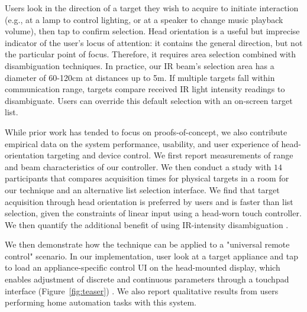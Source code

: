 Users look in the direction of a target they wish to acquire to initiate interaction (e.g., at a lamp to control lighting, or at a speaker to change music playback volume), then tap to confirm selection.  
%
Head orientation is a useful but imprecise indicator of the user's locus of attention: it contains the general direction, but not the particular point of focus. Therefore, it requires area selection  combined with disambiguation techniques.
In practice, our IR beam's selection area has a diameter of 60-120cm at distances up to 5m.
If multiple targets fall within communication range, targets compare received IR light intensity readings to disambiguate. Users can override this default selection with an  on-screen target list.


While prior work has tended to focus on proofs-of-concept, we also contribute empirical data on the system performance, usability, and user experience of head-orientation targeting and device control. We first report measurements of range and beam characteristics of our controller. We then conduct a study with $14$ participants that compares acquisition times for physical targets in a room for our technique and an alternative list selection interface. We find that target acquisition through head orientation is preferred by users and is faster than list selection, given the constraints of linear input using a head-worn touch controller. 
We then quantify the additional benefit of using IR-intensity disambiguation 
%
.

We then demonstrate how the technique can be applied to a "universal remote control" scenario. In our implementation, user look at a target appliance and tap to load an appliance-specific control UI on the head-mounted display, which enables adjustment of discrete and continuous parameters through a touchpad interface (Figure~\ref{fig:teaser}) . We also report qualitative results from users performing  home automation tasks with this system.

